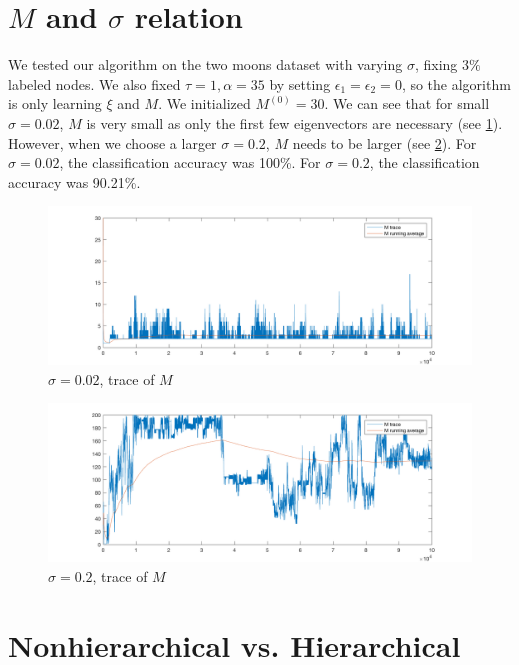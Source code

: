 \documentclass{siamart1116}
\begin{document}
\section{$M$ and $\sigma$ relation}
We tested our algorithm on the two moons dataset with varying $\sigma$, fixing $3\%$ labeled nodes. We also fixed $\tau=1,\alpha=35$ by setting $\epsilon_1=\epsilon_2=0$, so the algorithm is only learning $\xi$ and $M$. We initialized $M^{(0)} = 30$. We can see that for small $\sigma = 0.02$, $M$ is very small as only the first few eigenvectors are necessary (see \cref{fig:learnM_sigma_0.02}). However, when we choose a larger $\sigma = 0.2$, $M$ needs to be larger (see \cref{fig:learnM_sigma_0.20}). For $\sigma = 0.02$, the classification accuracy was 100\%. For $\sigma = 0.2$, the classification accuracy was 90.21\%.

\begin{figure}[!htb]
\caption{\label{fig:learnM_sigma_0.02} $\sigma=0.02$, trace of $M$}
\includegraphics[width=\linewidth]{old/sigma_0_02/M_trace.png}
\end{figure}
\begin{figure}[!htb]
\caption{\label{fig:learnM_sigma_0.20} $\sigma=0.2$, trace of $M$}
\includegraphics[width=\linewidth]{old/sigma_0_20/M_trace.png}
\end{figure}

\section{Nonhierarchical vs. Hierarchical}





\end{document}
